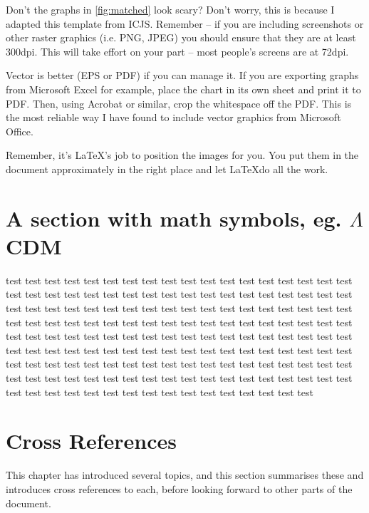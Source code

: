 Don't the graphs in \autoref{fig:matched} look scary? Don't worry, this is because I adapted this template from ICJS. Remember -- if you are including screenshots or other raster graphics (i.e. PNG, JPEG) you should ensure that they are at least 300dpi. This will take effort on your part -- most people's screens are at 72dpi.   

Vector is better (EPS or PDF) if you can manage it. If you are exporting graphs from Microsoft Excel for example, place the chart in its own sheet and print it to PDF. Then, using Acrobat or similar, crop the whitespace off the PDF. This is the most reliable way I have found to include vector graphics from Microsoft Office.

Remember, it's \LaTeX's job to position the images for you.  You put them in the document approximately in the right place and let \LaTeX  do all the work. 





\section{A section with math symbols, eg. \texorpdfstring{$\Lambda$}{Lambda}CDM}
test test test test test test test test test test test test test test test test test test test test
test test test test test test test test test test test test test test test test test test test test
test test test test test test test test test test test test test test test test test test test test
test test test test test test test test test test test test test test test test test test test test
test test test test test test test test test test test test test test test test test test test test
test test test test test test test test test test test test test test test test test test test test
test test test test test test test test test test test test test test test test test test test test
test test test test test test test test test test test test test test test test test test test test

\section{Cross References}

This chapter has introduced several topics, and this section summarises these and introduces cross references to each, before looking forward to other parts of the document.

